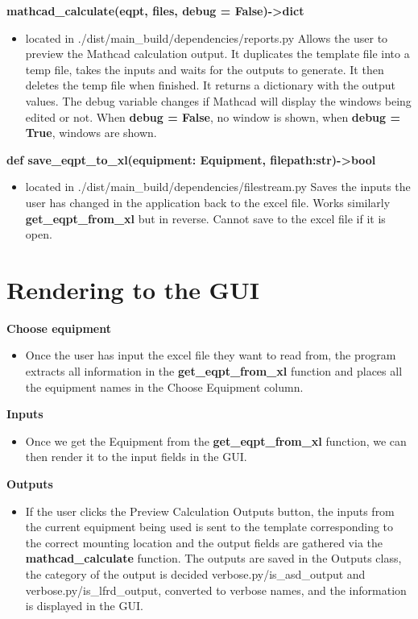 \documentclass[11pt]{article}
\begin{document}
\textbf{mathcad\_calculate(eqpt, files, debug = False)->dict}
\begin{itemize}
\item located in ./dist/main\_build/dependencies/reports.py
Allows the user to preview the Mathcad calculation output. It duplicates the template file into a temp file, takes the inputs and waits for the outputs to generate. It then deletes the temp file when finished. It returns a dictionary with the output values. The debug variable changes if Mathcad will display the windows being edited or not. When \textbf{debug = False}, no window is shown, when \textbf{debug = True}, windows are shown.
\end{itemize}

\textbf{def save\_eqpt\_to\_xl(equipment: Equipment, filepath:str)->bool}
\begin{itemize}
\item located in ./dist/main\_build/dependencies/filestream.py
Saves the inputs the user has changed in the application back to the excel file. Works similarly \textbf{get\_eqpt\_from\_xl} but in reverse. Cannot save to the excel file if it is open.
\end{itemize}

\section{Rendering to the GUI}
\label{sec:org83dbcfc}
\textbf{Choose equipment}
\begin{itemize}
\item Once the user has input the excel file they want to read from, the program extracts all information in the \textbf{get\_eqpt\_from\_xl} function and places all the equipment names in the Choose Equipment column.
\end{itemize}

\textbf{Inputs}
\begin{itemize}
\item Once we get the Equipment from the \textbf{get\_eqpt\_from\_xl} function, we can then render it to the input fields in the GUI.
\end{itemize}

\textbf{Outputs}
\begin{itemize}
\item If the user clicks the Preview Calculation Outputs button, the inputs from the current equipment being used is sent to the template corresponding to the correct mounting location and the output fields are gathered via the \textbf{mathcad\_calculate} function. The outputs are saved in the Outputs class, the category of the output is decided verbose.py/is\_asd\_output and verbose.py/is\_lfrd\_output, converted to verbose names, and the information is displayed in the GUI.
\end{itemize}
\end{document}
